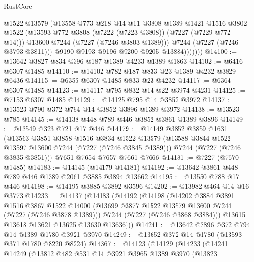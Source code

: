 \begin{lexlean}{RustCore}
\begin{coremodule}
                    @1522
                    @13579
                    (@13558
                      @773
                      @218
                      @14
                      @11
                      @3808
                      @1389
                      @1421
                      @1516
                      @3802
                      @1522
                      (@13593 @772 @3808 (@7222 (@7223 @3808)) (@7227 (@7229 @772 @14)))
                      @13600
                      @7244
                      (@7227 (@7246 @3803 @1389)))
                    @7244
                    (@7227 (@7246 @3793 @3811)))
                  @9190
                  @9193
                  @9196
                  @9200
                  @9205
                  @13884)))))))
@14100 := @13642 @3827 @834 @396 @187 @1389 @4233 @1389 @1863
@14102 := @6416 @6307 @1485
@14110 := @14102 @782 @187 @833 @23 @1389 @4232 @3829 @6436
@14115 := @6355 @6307 @1485 @833 @23 @4232
@14117 := @6364 @6307 @1485
@14123 := @14117 @795 @832 @14 @22 @3974 @4231
@14125 := @7153 @6307 @1485
@14129 := @14125 @795 @14 @3852 @3972
@14137 := @13523 @790 @372 @794 @14 @3852 @3896 @1389 @3972
@14138 := @13523 @785
@14145 := @14138 @448 @789 @446 @3852 @3861 @1389 @3896
@14149 := @13549 @323 @721 @17 @446
@14179 := @14149
    @3852
    @3859
    @1631
    (@13563
      @3851
      @3858
      @1516
      @3834
      @1522
      @13579
      (@13588 @3844 @1522 @13597 @13600 @7244 (@7227 (@7246 @3845 @1389)))
      @7244
      (@7227 (@7246 @3835 @3851)))
    @7651
    @7654
    @7657
    @7661
    @7666
@14181 := @7227 (@7670 @1485)
@14183 := @14145 (@14179 @14181)
@14192 := @13642 @3861 @448 @789 @446 @1389 @2061 @3885 @3894 @13662
@14195 := @13550 @788 @17 @446
@14198 := @14195 @3885 @3892 @3596
@14202 := @13982 @464 @14 @16 @3773
@14233 := @14137
    (@14183
      (@14192
        (@14198
          (@14202
            @3884
            @3891
            @1516
            @3867
            @1522
            @14000
            (@13699 @3877 @1522 @13579 @13600 @7244 (@7227 (@7246 @3878 @1389)))
            @7244
            (@7227 (@7246 @3868 @3884)))
          @13615
          @13618
          @13621
          @13625
          @13630
          @13636)))
@14241 := @13642 @3896 @372 @794 @14 @1389 @1780 @3921 @3970
@14249 := @13652 @372 @14 @1780 (@13593 @371 @1780 @8220 @8224)
@14367 := @14123
    (@14129
      (@14233
        (@14241
          @14249
          (@13812
            @482
            @531
            @14
            @3921
            @3965
            @1389
            @3970
            (@13823

\end{coremodule}
\end{lexlean}
